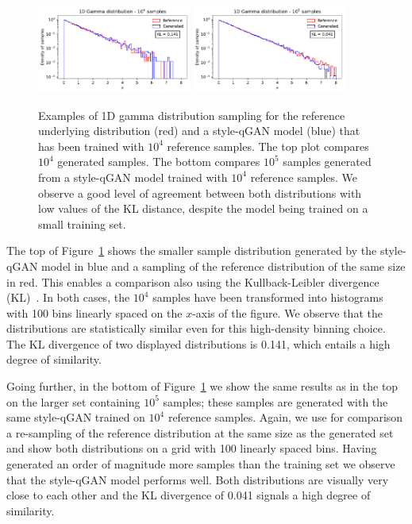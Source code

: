\documentclass[twocolumn,preprintnumbers,superscriptaddress]{revtex4-2}
\begin{document}
\begin{figure}
  \includegraphics[width=0.45\textwidth]{plots/1Dgamma/1Dgamma_distribution_10k.pdf}
  \includegraphics[width=0.45\textwidth]{plots/1Dgamma/1Dgamma_distribution_100k.pdf}
  \caption{\label{fig:gamma} Examples of 1D gamma distribution sampling for the
  reference underlying distribution (red) and a style-qGAN model (blue) that has been
  trained with $10^4$ reference samples. The top plot compares $10^4$ generated samples. The bottom compares $10^5$ samples generated from a style-qGAN model trained with $10^4$ reference samples. We observe a good level of agreement between both distributions with low values of the KL distance, despite the model being trained on a small training set.}
\end{figure}

The top of Figure~\ref{fig:gamma} shows the smaller sample distribution generated by the style-qGAN model in blue and a sampling of the reference distribution of the same size in red. This enables a comparison also using the Kullback-Leibler divergence (KL)~\cite{kullback1951information}. In both cases, the $10^4$ samples have been transformed into histograms with 100 bins linearly spaced on the $x$-axis of the figure. We observe that the distributions are statistically similar even for this high-density binning choice. The KL divergence of two displayed distributions is 0.141, which entails a high degree of similarity.

Going further, in the bottom of Figure~\ref{fig:gamma} we show the same results as in the top on the larger set containing $10^5$ samples; these samples are generated with the same style-qGAN trained on $10^4$ reference samples. Again, we use for comparison a re-sampling of the reference distribution at the same size as the generated set and show both distributions on a grid with 100 linearly spaced bins. 
%
Having generated an order of magnitude more samples than the training set we observe that the style-qGAN model performs well. Both distributions are visually very close to each other and the KL divergence of 0.041 signals a high degree of similarity. 
\end{document}
